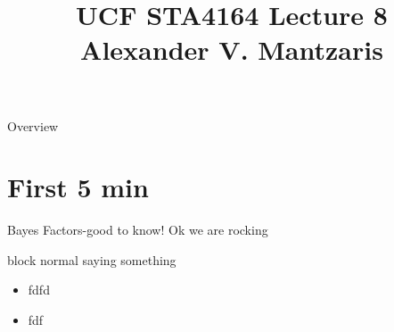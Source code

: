 \documentclass{beamer}
\title[Lecture 8 - STA4164]{UCF STA4164 Lecture 8\\ Alexander V. Mantzaris}
\author{\vspace{-33cm}}
\date{\vspace{-8cm}}
\begin{document}
\begin{frame}
  \titlepage
\end{frame}

\begin{frame}{Overview}
\tableofcontents
\end{frame}

\section{First 5 min}
\begin{frame}{Bayes Factors-good to know!} 
  Ok we are rocking
  \begin{block}{block normal}
    saying something
    \begin{itemize}
    \item fdfd
    \item fdf
    \end{itemize}
  \end{block}
  
\end{frame}
\end{document}

